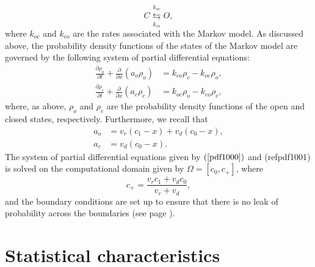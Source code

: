 \begin{equation}
C\underset{k_{co}}{\overset{k_{oc}}{\leftrightarrows}}O, \label{M100}
\end{equation}
where $k_{oc}$ and $k_{co}$ are the rates associated with the Markov model. As
discussed above, the probability density functions of the states of the Markov
model are governed by the following system of partial differential equations:
\begin{align}
\frac{\partial\rho_{o}}{\partial t}+\frac{\partial}{\partial x}\left(
a_{o}\rho_{o}\right)   &  =k_{co}\rho_{c}-k_{oc}\rho_{o},\label{pdf1000}\\
\frac{\partial\rho_{c}}{\partial t}+\frac{\partial}{\partial x}\left(
a_{c}\rho_{c}\right)   &  =k_{oc}\rho_{o}-k_{co}\rho_{c}, \label{pdf1001}
\end{align}
where, as above, $\rho_{o}$ and $\rho_{c}$ are the probability density
functions of the open and closed states, respectively. Furthermore, we recall
that
\begin{align}
a_{o}  &  =v_{r}(c_{1}-x)+v_{d}(c_{0}-x),\label{aos}\\
a_{c}  &  =v_{d}(c_{0}-x). \label{acs}
\end{align}
The system of partial differential equations given by $\left(
\ref{pdf1000}\right)$ and (ref{pdf1001}) is solved on the computational
domain given by $\Omega=[c_0,c_+]$, where
\[
c_{+}=\frac{v_{r}c_{1}+v_{d}c_{0}}{v_{r}+v_{d}},
\]
and the boundary conditions are set up to ensure that there is no leak of probability across the
boundaries (see page \pageref{bc}).

\section{Statistical characteristics}
\label{statistics}

